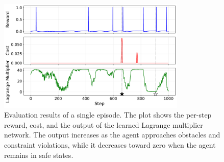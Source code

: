 \begin{figure}[H]
    \centering
    \includegraphics[width=0.8\textwidth]{figure/test/result.pdf}
    \caption{Evaluation results of a single episode. 
             The plot shows the per-step reward, cost, and the output of the learned Lagrange multiplier network. 
             The output increases as the agent approaches obstacles and constraint violations, while it decreases toward zero when the agent remains in safe states.}
    \label{fig:point_goal_test_results_a}
\end{figure}

